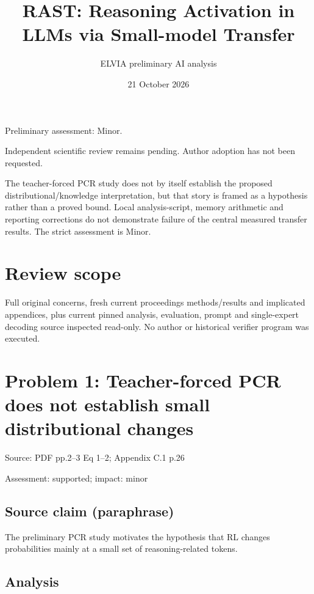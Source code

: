 \documentclass[11pt]{article}
\begin{document}
\title{RAST: Reasoning Activation in LLMs via Small-model Transfer}

\author{ELVIA preliminary AI analysis}\date{21 October 2026}\maketitle

Preliminary assessment: Minor.\par

Independent scientific review remains pending. Author adoption has not been requested.

The teacher-forced PCR study does not by itself establish the proposed distributional/knowledge interpretation, but that story is framed as a hypothesis rather than a proved bound. Local analysis-script, memory arithmetic and reporting corrections do not demonstrate failure of the central measured transfer results. The strict assessment is Minor.

\section*{Review scope}

Full original concerns, fresh current proceedings methods/results and implicated appendices, plus current pinned analysis, evaluation, prompt and single-expert decoding source inspected read-only. No author or historical verifier program was executed.

\section*{Problem 1: Teacher-forced PCR does not establish small distributional changes}

Source: PDF pp.2–3 Eq 1–2; Appendix C.1 p.26

Assessment: supported; impact: minor

\subsection*{Source claim (paraphrase)}

The preliminary PCR study motivates the hypothesis that RL changes probabilities mainly at a small set of reasoning-related tokens.

\subsection*{Analysis}
\end{document}
